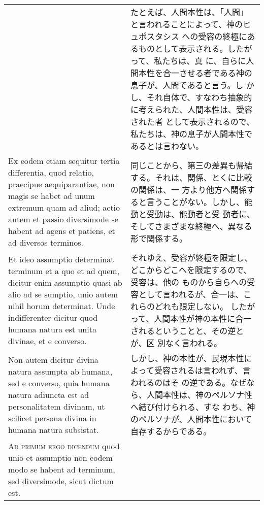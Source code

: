 \documentclass[10pt]{jsarticle} %
\begin{document}
\begin{longtable}{p{21em}p{21em}}
&

たとえば、人間本性は、「人間」と言われることによって、神のヒュポスタシス
への受容の終極にあるものとして表示される。したがって、私たちは、真
 に、自らに人間本性を合一させる者である神の息子が、人間であると言う。し
 かし、それ自体で、すなわち抽象的に考えられた、人間本性は、受容された者
 として表示されるので、私たちは、神の息子が人間本性であるとは言わない。


\\

Ex eodem etiam sequitur tertia differentia, quod relatio,
praecipue aequiparantiae, non magis se habet ad unum extremum quam ad
aliud; actio autem et passio diversimode se habent ad agens et patiens,
et ad diversos terminos. 


&

同じことから、第三の差異も帰結する。それは、関係、とくに比較の関係は、一
 方より他方へ関係すると言うことがない。しかし、能動と受動は、能動者と受
 動者に、そしてさまざまな終極へ、異なる形で関係する。


\\

Et ideo assumptio determinat terminum et a quo
et ad quem, dicitur enim assumptio quasi ab alio ad se sumptio, unio
autem nihil horum determinat. Unde indifferenter dicitur quod humana
natura est unita divinae, et e converso. 


&

それゆえ、受容が終極を限定し、どこからどこへを限定するので、受容は、他の
 ものから自らへの受容として言われるが、合一は、これらのどれも限定しない。
 したがって、人間本性が神の本性に合一されるということと、その逆とが、区
 別なく言われる。

\\

Non autem dicitur divina natura
assumpta ab humana, sed e converso, quia humana natura adiuncta est ad
personalitatem divinam, ut scilicet persona divina in humana natura
subsistat.


&

しかし、神の本性が、民現本性によって受容されるは言われず、言われるのはそ
 の逆である。なぜなら、人間本性は、神のペルソナ性へ結び付けられる、すな
 わち、神のペルソナが、人間本性において自存するからである。

\\



{\scshape Ad primum ergo dicendum} quod unio et assumptio non eodem modo se habent
ad terminum, sed diversimode, sicut dictum est.



\end{longtable}
\end{document}
